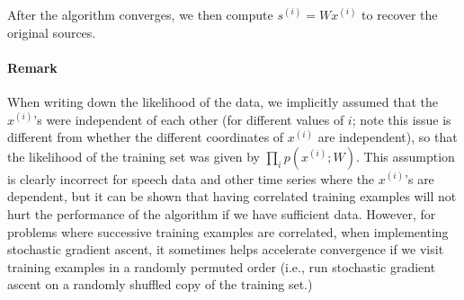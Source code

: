 After the algorithm converges, we then compute $s^{(i)} = Wx^{(i)}$ to recover
the original sources.

\paragraph{Remark} When writing down the likelihood of the data, we implicitly
assumed that the $x^{(i)}$'s were independent of each other (for different values
of $i$; note this issue is different from whether the different coordinates of
$x^{(i)}$ are independent), so that the likelihood of the training set was given
by $\prod_i p(x^{(i)}; W)$. This assumption is clearly incorrect for speech data and
other time series where the $x^{(i)}$'s are dependent, but it can be shown that
having correlated training examples will not hurt the performance of the
algorithm if we have sufficient data. However, for problems where successive
training examples are correlated, when implementing stochastic gradient
ascent, it sometimes helps accelerate convergence if we visit training examples
in a randomly permuted order (i.e., run stochastic gradient ascent on a
randomly shuffled copy of the training set.)
